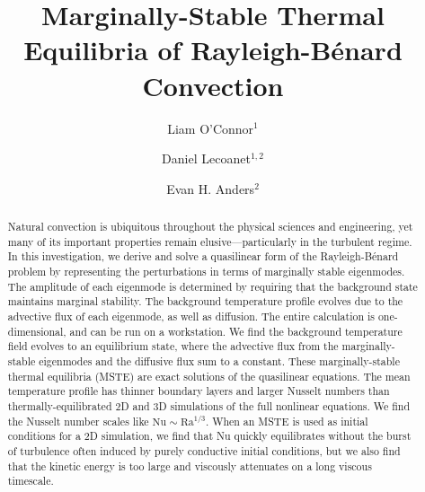 \documentclass[reprint,amsmath,amssymb,aps]{revtex4-1}
\newcommand\Ra{\mathrm{Ra}}
\newcommand\Nu{\mathrm{Nu}}
\begin{document}
\title{Marginally-Stable Thermal Equilibria of Rayleigh-Bénard Convection}

\author{Liam O'Connor$^1$}
\author{Daniel Lecoanet$^{1, 2}$}
\author{Evan H. Anders$^2$}

\begin{abstract}
    Natural convection is ubiquitous throughout the physical sciences and engineering, yet many of its important properties remain elusive---particularly in the turbulent regime.
    In this investigation, we derive and solve a quasilinear form of the Rayleigh-Bénard problem by representing the perturbations in terms of marginally stable eigenmodes.
    The amplitude of each eigenmode is determined by requiring that the background state maintains marginal stability.
    The background temperature profile evolves due to the advective flux of each eigenmode, as well as diffusion.
    The entire calculation is one-dimensional, and can be run on a workstation.
    We find the background temperature field evolves to an equilibrium state, where the advective flux from the marginally-stable eigenmodes and the diffusive flux sum to a constant.
    These marginally-stable thermal equilibria (MSTE) are exact solutions of the quasilinear equations.
    The mean temperature profile has thinner boundary layers and larger Nusselt numbers than thermally-equilibrated 2D and 3D simulations of the full nonlinear equations.
    We find the Nusselt number scales like $\Nu \sim\Ra^{1/3}$.
    When an MSTE is used as initial conditions for a 2D simulation, we find that Nu quickly equilibrates without the burst of turbulence often induced by purely conductive initial conditions, but we also find that the kinetic energy is too large and viscously attenuates on a long viscous timescale.
\end{abstract}

\maketitle
\end{document}
